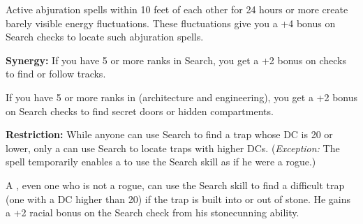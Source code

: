 Active abjuration spells within 10 feet of each other for 24 hours or more create 
barely visible energy fluctuations. These fluctuations give you a +4 bonus on Search 
checks to locate such abjuration spells.

\textbf{Synergy:} If you have 5 or more ranks in Search, you get a +2 bonus on 
 checks to find or follow tracks.

If you have 5 or more ranks in  (architecture and engineering), you get 
a +2 bonus on Search checks to find secret doors or hidden compartments.

\textbf{Restriction:} While anyone can use Search to find a trap whose DC is 20 
or lower, only a  can use Search to locate traps with higher DCs. (\textit{Exception:} The spell  temporarily enables a  to use the Search skill 
as if he were a rogue.)

A , even one who is not a rogue, can use the Search skill to find a difficult 
trap (one with a DC higher than 20) if the trap is built into or out of stone. 
He gains a +2 racial bonus on the Search check from his stonecunning ability.
